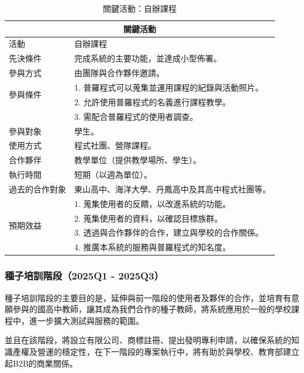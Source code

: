 \begin{table}[H]
  \centering
  \caption{關鍵活動：自辦課程}
  \begin{tabular}{|l|l|}
      \hline
      \multicolumn{2}{|c|}{\textbf{關鍵活動}} \\ \hline
      活動 & 自辦課程 \\ \hline
      先決條件 & 完成系統的主要功能，並達成小型佈署。 \\ \hline
      參與方式 & 由團隊與合作夥伴邀請。 \\ \hline
      \multirow{2}{*}{參與條件} & 1. 普羅程式可以蒐集並運用課程的紀錄與活動照片。 \\
      & 2. 允許使用普羅程式的名義進行課程教學。 \\
      & 3. 需配合普羅程式的使用者調查。 \\ \hline
      參與對象 & 學生。 \\ \hline
      使用方式 & 程式社團、營隊課程。 \\ \hline 
      合作夥伴 & 教學單位（提供教學場所、學生）。 \\ \hline
      執行時間 & 短期（以週為單位）。 \\ \hline 
      過去的合作對象 & 東山高中、海洋大學、丹鳳高中及其高中程式社團等。 \\ \hline
      \multirow{4}{*}{預期效益} & 1. 蒐集使用者的反饋，以改進系統的功能。 \\
      & 2. 蒐集使用者的資料，以確認目標族群。 \\
      & 3. 透過與合作夥伴的合作，建立與學校的合作關係。 \\
      & 4. 推廣本系統的服務與普羅程式的知名度。 \\ \hline
  \end{tabular}
\end{table}

\subsubsection{種子培訓階段（2025Q1 - 2025Q3）}

種子培訓階段的主要目的是，延伸與前一階段的使用者及夥伴的合作，並培育有意願參與的國高中教師，讓其成為我們合作的種子教師，將系統應用於一般的學校課程中，進一步擴大測試與服務的範圍。

並且在該階段，將設立有限公司、商標註冊、提出發明專利申請，以確保系統的知識產權及營運的穩定性，在下一階段的專案執行中，將有助於與學校、教育部建立起B2B的商業關係。

